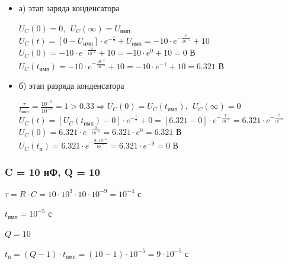 \documentclass[a4paper,14pt]{extarticle}
\begin{document}
\begin{itemize}
	\item[] а) этап заряда конденсатора

	$U_C(0) = 0,\ \ U_C(\infty) = U_\text{имп}$\\
	$U_C(t) = [0 - U_\text{имп}] \cdot e^{-\frac{t}{\tau}} + U_\text{имп} = -10 \cdot e^{-\frac{t}{10^{-5}}} + 10$\\
	$U_C(0) = -10 \cdot e^{-\frac{0}{10^{-5}}} + 10 = -10 \cdot e^0 + 10 = 0 \text{ В}$\\
	$U_C(t_\text{имп}) = -10 \cdot e^{-\frac{10^{-5}}{10^{-5}}} + 10 = -10 \cdot e^{-1} + 10 = 6.321 \text{ В}$

	\item[] б) этап разряда конденсатора

		$\frac{\tau}{t_\text{имп}} = \frac{10^{-5}}{10^{-5}} = 1 > 0.33 \Rightarrow U_C(0) = U_C(t_\text{имп}),\ \ U_C(\infty) = 0$\\
	$U_C(t) = [U_C(t_\text{имп}) - 0] \cdot e^{-\frac{t}{\tau}} + 0 =  [6.321 - 0] \cdot e^{-\frac{t}{10^{-5}}} = 6.321 \cdot e^{-\frac{t}{10^{-5}}}$\\
	$U_C(0) = 6.321 \cdot e^{-\frac{0}{10^{-5}}} = 6.321 \cdot e^0 = 6.321 \text{ В}$\\
	$U_C(t_\text{п}) = 6.321 \cdot e^{-\frac{9 \cdot 10^{-5}}{10^{-5}}} = 6.321 \cdot e^{-9} = 0 \text{ В}$
\end{itemize}

\subsubsection{C = 10 нФ, Q = 10}

$\tau = R \cdot C = 10 \cdot 10^3 \cdot 10 \cdot 10^{-9} = 10^{-4} \text{ с}$

$t_\text{имп} = 10^{-5} \text{ с}$

$Q = 10$		

$t_\text{п} = (Q - 1) \cdot t_\text{имп} = (10 - 1) \cdot 10^{-5} = 9 \cdot 10^{-5} \text{ с}$
\end{document}
